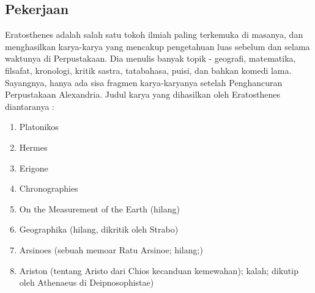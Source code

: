 \subsection{Pekerjaan}
Eratosthenes adalah salah satu tokoh ilmiah paling terkemuka di masanya, dan menghasilkan karya-karya yang mencakup pengetahuan luas sebelum dan selama waktunya di Perpustakaan. Dia menulis banyak topik - geografi, matematika, filsafat, kronologi, kritik sastra, tatabahasa, puisi, dan bahkan komedi lama. Sayangnya, hanya ada sisa fragmen karya-karyanya setelah Penghancuran Perpustakaan Alexandria. Judul karya yang dihasilkan oleh Eratosthenes \cite{gulickathenaeus} diantaranya :
\begin{enumerate}
\item	Platonikos
\item	Hermes
\item	Erigone
\item	Chronographies
\item	On the Measurement of the Earth (hilang)
\item	Geographika (hilang, dikritik oleh Strabo)
\item	Arsinoes (sebuah memoar Ratu Arsinoe; hilang;)
\item	Ariston (tentang Aristo dari Chios kecanduan kemewahan); kalah; dikutip oleh Athenaeus di Deipnosophistae) 
\end{enumerate}
